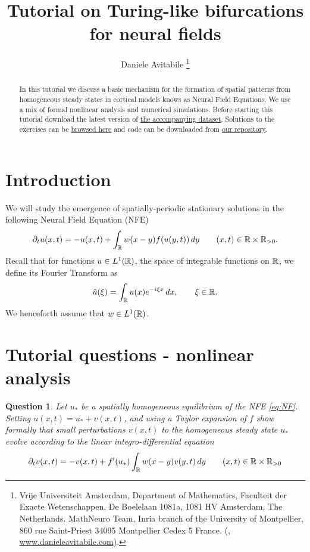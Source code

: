 \documentclass[a4paper]{siamonline220329}
\title{Tutorial on Turing-like bifurcations for neural fields}
\author{%
  Daniele Avitabile%
  \thanks{%
    Vrije Universiteit Amsterdam,
    Department of Mathematics,
    Faculteit der Exacte Wetenschappen,
    De Boelelaan 1081a,
    1081 HV Amsterdam, The Netherlands.
  \protect
    MathNeuro Team,
    Inria branch of the University of Montpellier,
    860 rue Saint-Priest
    34095 Montpellier Cedex 5
    France.
  \protect
    (\email{d.avitabile@vu.nl}, \url{www.danieleavitabile.com}).
  }
}
\theoremstyle{plain}
\newtheorem{question}{Question}
\begin{document}
\maketitle

\begin{abstract}
  In this tutorial we discuss a basic mechanism for the formation of spatial patterns
  from homogeneous steady states in cortical models knows as Neural Field Equations.
  We use a mix of formal nonlinear analysis and numerical simulations. Before
  starting this tutorial download the latest version of \href{https://zenodo.org/records/11120604}{the accompanying
  dataset}. Solutions to the exercises can be 
  \href{http://htmlpreview.github.io/?https://github.com/danieleavitabile/numerical-analysis-mathematical-neuroscience/blob/main/Tutorials/Tutorial1/Solutions/html/driver.html}{browsed here}
  and code can be downloaded from
  \href{https://github.com/danieleavitabile/numerical-analysis-mathematical-neuroscience/tree/main}{our
  repository}.
\end{abstract}

\section{Introduction}\label{sec:intro} 
We will study the emergence of spatially-periodic stationary solutions in the
following Neural Field Equation (NFE)
\begin{equation}\label{eq:NF}
  \partial_{t}u(x,t) = -u(x,t) + \int_{\RSet}w(x-y)f(u(y,t)) \,d y \qquad (x,t) \in
  \RSet \times \RSet_{>0}.
\end{equation}
Recall that for functions $u \in L^1(\mathbb{R})$, the space of integrable functions on
$\mathbb{R}$, we define its Fourier Transform as
\[
  \hat u(\xi) = \int_{\mathbb{R}} u(x) e^{-i\xi x} \,d x, \qquad \xi \in \mathbb{R}.
\]
We henceforth assume that $w \in L^1(\mathbb{R})$.

\section{Tutorial questions - nonlinear analysis}\label{sec:questions} 
\begin{question}\label{question:linearisation}
Let $u_*$ be a spatially homogeneous equilibrium
of the NFE \cref{eq:NF}. Setting $u(x,t) = u_* + v(x,t)$, and using a Taylor
expansion of $f$ show formally that small perturbations $v(x,t)$ to the homogeneous
steady state $u_*$ evolve according to the linear integro-differential equation
\begin{equation}\label{eq:linear}
  \partial_{t}v(x,t) = -v(x,t) + f'(u_*)\int_{\RSet}w(x-y)v(y,t) \,d y \qquad (x,t) \in \RSet \times \RSet_{>0}
\end{equation}
\end{question}
\end{document}
